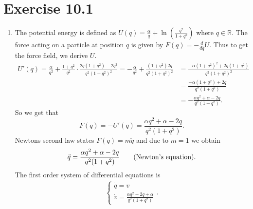 \documentclass[a4paper]{article}
\theoremstyle{plain}
\begin{document}
\section*{Exercise 10.1}
\begin{enumerate}[label=(\alph*)]
	\item The potential energy is defined as $U(q) = \frac{\alpha}{q} + \ln(\frac{q^2}{1+q^2})$ where $q \in \mathbb R$. The force acting on a particle at position $q$ is given by $F(q) = - \frac{d}{dq}U.$ Thus to get the force field, we derive $U$.
	\begin{align*}
		U'(q) = \frac{\alpha}{q^2} + \frac{1+q^2}{q^2} \cdot \frac{2q(1+q^2) - 2q^3}{q^2(1+q^2)^2} = -\frac{\alpha}{q^2} + \frac{(1+q^2)2q}{q^2(1+q^2)^2} &= \frac{-\alpha(1+q^2)^2 + 2q(1+q^2)}{q^2(1+q^2)^2} \\
		&= \frac{-\alpha(1+q^2) + 2q}{q^2(1+q^2)} \\
		&= -\frac{\alpha q^2 + \alpha - 2q}{q^2(1+q^2)}.
	\end{align*}
	So we get that 
	\[
		F(q) = -U'(q) = \frac{  \alpha q^2 + \alpha - 2q}{q^2(1+q^2)}.
	\]
	Newtons second law states $F(q) = m \ddot q $ and due to $m=1$ we obtain
	\[
		\ddot q = \frac{  \alpha q^2 + \alpha - 2q}{q^2(1+q^2)} \tag{\text{Newton's equation}}.
	\]
	The first order system of differential equations is
	\begin{align*}
		\begin{cases}
			\dot q = v \\
			\dot v = \frac{\alpha q^2 -2 q + \alpha}{q^2(1+q^2)}
		\end{cases}.
	\end{align*}
	

\end{enumerate}
\end{document}
